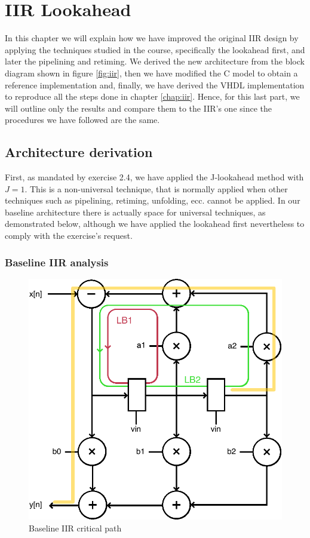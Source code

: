 \chapter{IIR Lookahead}
\label{chap:iir_lookahead}

In this chapter we will explain how we have improved the original IIR design by applying the techniques studied in the course,
specifically the lookahead first, and later the pipelining and retiming. We derived the new architecture from the block diagram shown in
figure \ref{fig:iir}, then we have modified the C model to obtain a reference implementation and, finally, we have derived
the VHDL implementation to reproduce all the steps done in chapter \ref{chap:iir}. Hence, for this last part, we will
outline only the results and compare them to the IIR's one since the procedures we have followed are the same.

\section{Architecture derivation}

First, as mandated by exercise 2.4, we have applied the J-lookahead method with $J = 1$. This is a non-universal technique,
that is normally applied when other techniques such as pipelining, retiming, unfolding, ecc. cannot be applied. In our baseline
architecture there is actually space for universal techniques, as demonstrated below, although we have applied the lookahead
first nevertheless to comply with the exercise's request.

\subsection{Baseline IIR analysis}

\begin{figure}[!ht]
	\centering
	\includegraphics[width=0.4\linewidth]{./chapters/pictures/loop_bound_iir.pdf}
	\caption{Baseline IIR critical path}
	\label{fig:loop_bound_iir}
\end{figure}

